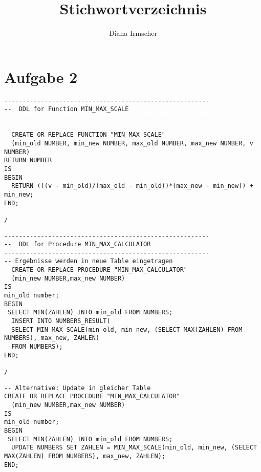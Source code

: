 \documentclass{scrartcl}
\begin{document}
\begin{titlepage}
\titlehead{Hochschule München, Fakultät 07, SoSe 2016}
\subject{Software-Architektur}
\title{Stichwortverzeichnis}
\subtitle{}
\author{Diana Irmscher}
\end{titlepage}

\maketitle

\section*{Aufgabe 2}
\begin{lstlisting}
--------------------------------------------------------
--  DDL for Function MIN_MAX_SCALE
--------------------------------------------------------

  CREATE OR REPLACE FUNCTION "MIN_MAX_SCALE" 
  (min_old NUMBER, min_new NUMBER, max_old NUMBER, max_new NUMBER, v NUMBER)
RETURN NUMBER
IS
BEGIN
  RETURN (((v - min_old)/(max_old - min_old))*(max_new - min_new)) + min_new;
END;

/
\end{lstlisting}
\begin{lstlisting}
--------------------------------------------------------
--  DDL for Procedure MIN_MAX_CALCULATOR
--------------------------------------------------------
-- Ergebnisse werden in neue Table eingetragen
  CREATE OR REPLACE PROCEDURE "MIN_MAX_CALCULATOR" 
  (min_new NUMBER,max_new NUMBER)
IS
min_old number;
BEGIN
 SELECT MIN(ZAHLEN) INTO min_old FROM NUMBERS;
  INSERT INTO NUMBERS_RESULT(
  SELECT MIN_MAX_SCALE(min_old, min_new, (SELECT MAX(ZAHLEN) FROM NUMBERS), max_new, ZAHLEN)
  FROM NUMBERS);
END;

/
\end{lstlisting}
\begin{lstlisting}
-- Alternative: Update in gleicher Table
CREATE OR REPLACE PROCEDURE "MIN_MAX_CALCULATOR" 
  (min_new NUMBER,max_new NUMBER)
IS
min_old number;
BEGIN
 SELECT MIN(ZAHLEN) INTO min_old FROM NUMBERS;
  UPDATE NUMBERS SET ZAHLEN = MIN_MAX_SCALE(min_old, min_new, (SELECT MAX(ZAHLEN) FROM NUMBERS), max_new, ZAHLEN);
END;
\end{lstlisting}
\end{document}
